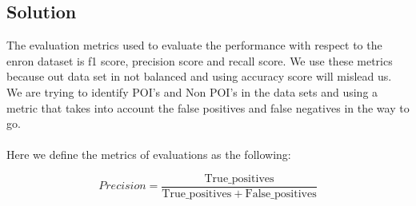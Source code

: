 \documentclass[12pt]{article}%
\begin{document}
\subsection*{Solution}

The evaluation metrics used to evaluate the performance with respect to the enron dataset is f1 score, precision score and recall score. We use these metrics because out data set in not balanced and using accuracy score will mislead us. We are trying to identify POI's and Non POI's in the data sets and using a metric that takes into account the false positives and false negatives in the way to go.
\\
\\
Here we define the metrics of evaluations as the following:

\begin{equation}
Precision = \frac{\mathrm{True\_positives}}{\mathrm{True\_positives} + \mathrm{False\_positives}}
\end{equation}
\end{document}
